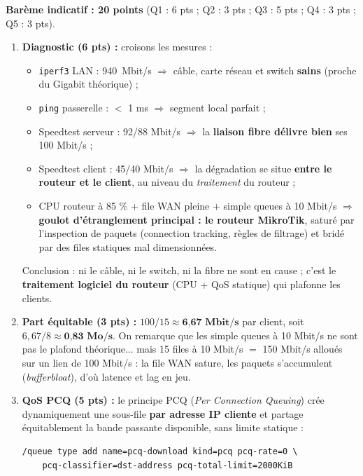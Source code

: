 \documentclass[11pt]{article}
\begin{document}
\begin{corrige}
\textbf{Barème indicatif : 20 points} (Q1 : 6 pts ; Q2 : 3 pts ; Q3 : 5 pts ; Q4 : 3 pts ; Q5 : 3 pts).

\begin{enumerate}
    \item \textbf{Diagnostic (6 pts) :} croisons les mesures :
    \begin{itemize}
        \item \texttt{iperf3} LAN : \SI{940}{Mbit/s} $\Rightarrow$ câble, carte réseau et switch \textbf{sains} (proche du Gigabit théorique) ;
        \item \texttt{ping} passerelle : $<$ 1 ms $\Rightarrow$ segment local parfait ;
        \item Speedtest serveur : 92/88 Mbit/s $\Rightarrow$ la \textbf{liaison fibre délivre bien} ses 100 Mbit/s ;
        \item Speedtest client : 45/40 Mbit/s $\Rightarrow$ la dégradation se situe \textbf{entre le routeur et le client}, au niveau du \emph{traitement} du routeur ;
        \item CPU routeur à 85 \% + file WAN pleine + simple queues à 10 Mbit/s $\Rightarrow$ \textbf{goulot d'étranglement principal : le routeur MikroTik}, saturé par l'inspection de paquets (connection tracking, règles de filtrage) et bridé par des files statiques mal dimensionnées.
    \end{itemize}
    Conclusion : ni le câble, ni le switch, ni la fibre ne sont en cause ; c'est le \textbf{traitement logiciel du routeur} (CPU + QoS statique) qui plafonne les clients.
    \item \textbf{Part équitable (3 pts) :} $100 / 15 \approx \textbf{6,67 Mbit/s}$ par client, soit $6{,}67 / 8 \approx \textbf{0,83 Mo/s}$. On remarque que les simple queues à 10 Mbit/s ne sont pas le plafond théorique... mais 15 files à 10 Mbit/s $=$ 150 Mbit/s alloués sur un lien de 100 Mbit/s : la file WAN sature, les paquets s'accumulent (\emph{bufferbloat}), d'où latence et lag en jeu.
    \item \textbf{QoS PCQ (5 pts) :} le principe PCQ (\emph{Per Connection Queuing}) crée dynamiquement une sous-file \textbf{par adresse IP cliente} et partage équitablement la bande passante disponible, sans limite statique :
\begin{lstlisting}
/queue type add name=pcq-download kind=pcq pcq-rate=0 \
    pcq-classifier=dst-address pcq-total-limit=2000KiB

\end{lstlisting}
\end{enumerate}
\end{corrige}
\end{document}

